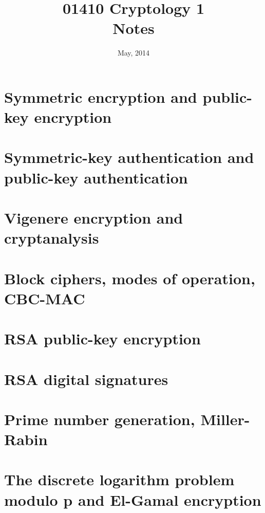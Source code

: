 \documentclass{article}
\title{
  01410 Cryptology 1\\
  Notes
}
\date{May, 2014}
\author{}
\begin{document}
\maketitle
\clearpage

\tableofcontents
\clearpage

\section{Symmetric encryption and public-key encryption}

\clearpage

\section{Symmetric-key authentication and public-key authentication}

\clearpage

\section{Vigenere encryption and cryptanalysis}

\clearpage

\section{Block ciphers, modes of operation, CBC-MAC}

\clearpage

\section{RSA public-key encryption}

\clearpage

\section{RSA digital signatures}

\clearpage

\section{Prime number generation, Miller-Rabin}

\clearpage

\section{The discrete logarithm problem modulo p and El-Gamal encryption}

\clearpage
\end{document}
